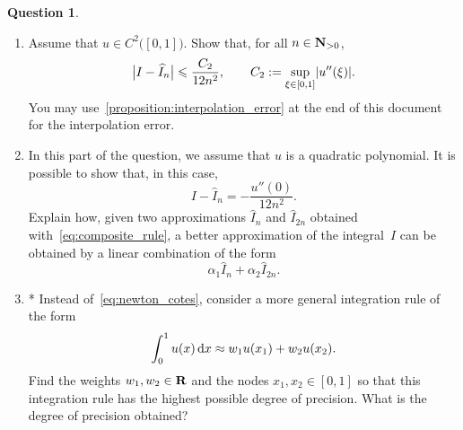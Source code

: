 \documentclass[11pt]{article}
\theoremstyle{definition}
\newtheorem{question}{Question}
\theoremstyle{remark}
\theoremstyle{plain}%
\begin{document}
\begin{question}
\begin{enumerate}
        \item
            Assume that $u \in C^2\bigl([0, 1]\bigr)$.
            Show that, for all $n \in \mathbf N_{>0}$,
            \begin{equation}
                \label{eq:error_bound_trapezoidal}
                \bigl\lvert I - \widehat I_n \bigr\rvert
                \leq \frac{C_2}{12 n^2},
                \qquad
                C_2 := \sup_{\xi \in [0, 1]} \abs*{u''(\xi)}.
            \end{equation}
            You may use~\cref{proposition:interpolation_error} at the end of this document for the interpolation error.
        \item
        \mymark
        In this part of the question, we assume that $u$ is a quadratic polynomial.
        It is possible to show that, in this case,
        \[
             I - \widehat I_n = - \frac{u''(0)}{12 n^2}.
        \]
        Explain how, given two approximations $\widehat I_n$ and $\widehat I_{2n}$ obtained with~\eqref{eq:composite_rule},
        a better approximation of the integral~$I$ can be obtained by a linear combination of the form
        \[
            \alpha_1 \widehat I_n + \alpha_2 \widehat I_{2n}.
        \]

        \item
        *
        Instead of~\eqref{eq:newton_cotes},
        consider a more general integration rule of the form
        \begin{equation}
            \label{eq:gauss_legendre}
            \int_{0}^{1} u(x) \, \mathrm d x \approx w_1 u(x_1) + w_2 u(x_2).
        \end{equation}
        Find the weights $w_1, w_2 \in \mathbf R$ and the nodes $x_1, x_2 \in [0, 1]$ so that this integration rule has the highest possible degree of precision.
        What is the degree of precision obtained?

    \end{enumerate}
\end{question}
\end{document}
